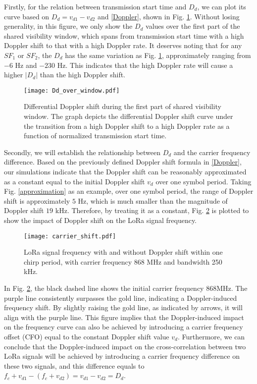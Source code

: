 \documentclass{IEEEtaes}
\theoremstyle{plain}
\begin{document}
Firstly, for the relation between transmission start time and $D_d$, we can plot its curve based on $D_d = v_{d1} - v_{d2}$ and \eqref{Doppler}, shown in Fig. \ref{Dd_over_window}. Without losing generality, in this figure, we only show the $D_d$ values over the first part of the shared visibility window, which spans from transmission start time with a high Doppler shift to that with a high Doppler rate. It deserves noting that for any $SF_1$ or $SF_2$, the $D_d$ has the same variation as Fig. \ref{Dd_over_window}, approximately ranging from $-6 $ Hz and $-230$ Hz. This indicates that the high Doppler rate will cause a higher $|D_d|$ than the high Doppler shift. 

\begin{figure}[ht]
  \centering
  \texttt{[image: Dd\_over\_window.pdf]}
  \caption{Differential Doppler shift during the first part of shared visibility window. The graph depicts the differential Doppler shift curve under the transition from a high Doppler shift to a high Doppler rate as a function of normalized transmission start time.}
  \label{Dd_over_window}
\end{figure}

Secondly, we will establish the relationship between $D_d$ and the carrier frequency difference. Based on the previously defined Doppler shift formula in \eqref{Doppler}, our simulations indicate that the Doppler shift can be reasonably approximated as a constant equal to the initial Doppler shift $v_d$ over one symbol period. Taking Fig. \ref{approximation} as an example, over one symbol period, the range of Doppler shift is approximately $5$ Hz, which is much smaller than the magnitude of Doppler shift $19$ kHz. Therefore, by treating it as a constant, Fig. \ref{carrier_shift} is plotted to show the impact of Doppler shift on the LoRa signal frequency. 
\begin{figure}[ht]
  \centering
  \texttt{[image: carrier\_shift.pdf]}
  \caption{LoRa signal frequency with and without Doppler shift within one chirp period, with carrier frequency 868 MHz and bandwidth 250 kHz.}
  \label{carrier_shift}
\end{figure}

In Fig. \ref{carrier_shift}, the black dashed line shows the initial carrier frequency $868$MHz. The purple line consistently surpasses the gold line, indicating a Doppler-induced frequency shift. By slightly raising the gold line, as indicated by arrows, it will align with the purple line. This figure implies that the Doppler-induced impact on the frequency curve can also be achieved by introducing a carrier frequency offset (CFO) equal to the constant Doppler shift value $v_d$. Furthermore, we can conclude that the Doppler-induced impact on the cross-correlation between two LoRa signals will be achieved by introducing a carrier frequency difference on these two signals, and this difference equals to $f_{c}+v_{d1} - (f_{c}+v_{d2}) = v_{d1} - v_{d2} = D_d$. 
\end{document}

